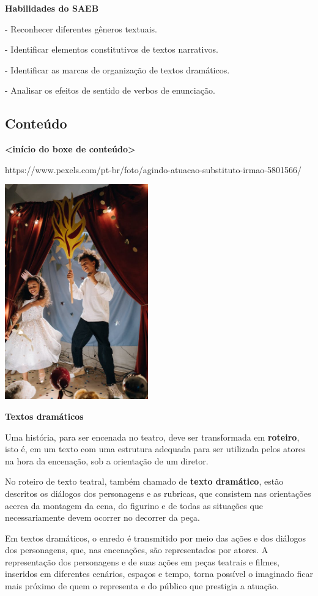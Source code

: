 \textbf{Habilidades do SAEB}

- Reconhecer diferentes gêneros textuais.

- Identificar elementos constitutivos de textos narrativos.

- Identificar as marcas de organização de textos dramáticos.

- Analisar os efeitos de sentido de verbos de enunciação.

\subsection{Conteúdo}\label{conteuxfado-1}

\textbf{\textless{}início do boxe de conteúdo\textgreater{}}

https://www.pexels.com/pt-br/foto/agindo-atuacao-substituto-irmao-5801566/

\includegraphics[width=2.43750in,height=3.65625in]{media/image1.jpeg}

\textbf{Textos dramáticos}

Uma história, para ser encenada no teatro, deve ser transformada em
\textbf{roteiro}, isto é, em um texto com uma estrutura adequada para
ser utilizada pelos atores na hora da encenação, sob a orientação de um
diretor.

No roteiro de texto teatral, também chamado de \textbf{texto dramático},
estão descritos os diálogos dos personagens e as rubricas, que consistem
nas orientações acerca da montagem da cena, do figurino e de todas as
situações que necessariamente devem ocorrer no decorrer da peça.

Em textos dramáticos, o enredo é transmitido por meio das ações e dos
diálogos dos personagens, que, nas encenações, são representados por
atores. A representação dos personagens e de suas ações em peças
teatrais e filmes, inseridos em diferentes cenários, espaços e tempo,
torna possível o imaginado ficar mais próximo de quem o representa e do
público que prestigia a atuação.~

